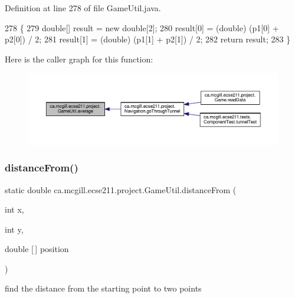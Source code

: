 Definition at line 278 of file Game\+Util.\+java.


\begin{DoxyCode}
278                                                      \{
279     \textcolor{keywordtype}{double}[] result = \textcolor{keyword}{new} \textcolor{keywordtype}{double}[2];
280     result[0] = (double) (p1[0] + p2[0]) / 2;
281     result[1] = (double) (p1[1] + p2[1]) / 2;
282     \textcolor{keywordflow}{return} result;
283   \}
\end{DoxyCode}
Here is the caller graph for this function\+:\nopagebreak
\begin{figure}[H]
\begin{center}
\leavevmode
\includegraphics[width=350pt]{classca_1_1mcgill_1_1ecse211_1_1project_1_1_game_util_ae5c5c445ab84516991219ca3783fcaa4_icgraph}
\end{center}
\end{figure}
\mbox{\label{classca_1_1mcgill_1_1ecse211_1_1project_1_1_game_util_a6fb324a3d5e42414c83dfd8bd5910b56}} 
\subsubsection{\texorpdfstring{distance\+From()}{distanceFrom()}}
{\footnotesize\ttfamily static double ca.\+mcgill.\+ecse211.\+project.\+Game\+Util.\+distance\+From (\begin{DoxyParamCaption}\item[{int}]{x,  }\item[{int}]{y,  }\item[{double \mbox{[}$\,$\mbox{]}}]{position }\end{DoxyParamCaption})\hspace{0.3cm}{\ttfamily [static]}}

find the distance from the starting point to two points


